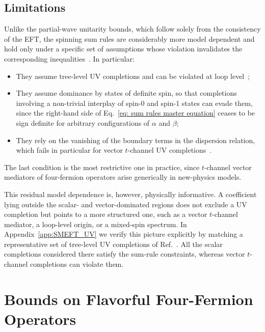 \subsection{Limitations}

Unlike the partial-wave unitarity bounds, which follow solely from the consistency of the EFT, the
spinning sum rules are considerably more model dependent and hold only under a specific set of
assumptions whose violation invalidates the corresponding
inequalities~\cite{Remmen:2020uze,Remmen:2022orj,Azatov:2021ygj,Gu:2020thj}. In particular:
\begin{itemize}
    \item They assume tree-level UV completions and can be violated at loop level~\cite{Azatov:2021ygj,Remmen:2020uze};
    \item They assume dominance by states of definite spin, so that completions involving a
    non-trivial interplay of spin-0 and spin-1 states can evade them, since the right-hand side of
    Eq.~\eqref{eq: sum rules master equation} ceases to be sign definite for arbitrary configurations
    of $\alpha$ and $\beta$;
    \item They rely on the vanishing of the boundary terms in the dispersion relation, which fails in
    particular for vector $t$-channel UV
    completions~\cite{Remmen:2020uze,Remmen:2022orj,Azatov:2021ygj}.
\end{itemize}
The last condition is the most restrictive one in practice, since $t$-channel vector mediators of
four-fermion operators arise generically in new-physics models.

This residual model dependence is, however, physically informative. A coefficient lying outside the
scalar- and vector-dominated regions does not exclude a UV completion but points to a more
structured one, such as a vector $t$-channel mediator, a loop-level origin, or a mixed-spin spectrum.
In Appendix~\ref{app:SMEFT_UV} we verify this picture explicitly by matching a representative set of
tree-level UV completions of Ref.~\cite{deBlas:2017xtg}. All the scalar completions considered there satisfy the
sum-rule constraints, whereas vector $t$-channel completions can violate them.

\section{Bounds on Flavorful Four-Fermion Operators\label{sec:SMEFT_multiflavor}}

